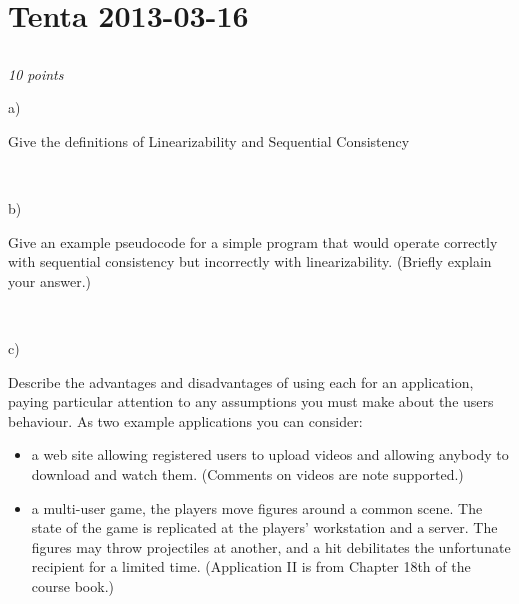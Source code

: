 \documentclass[a4paper]{article}
\newcommand{\points}[1]{\subsection{} \textit{#1 points}\\}
\newcommand{\question}[2][]{
  \noindent
  \parbox[t]{\textwidth}{#1 \parbox[t]{0.95\textwidth}{#2}}\\
}
\begin{document}
\section{Tenta 2013-03-16}
\points{10}
\label{2013-03:linearizability}
\question[a)]{
  Give the definitions of Linearizability and Sequential Consistency
}
\question[b)]{
  Give an example pseudocode for a simple program that
  would operate correctly with sequential consistency but incorrectly
  with linearizability. (Briefly explain your answer.)
}
\question[c)]{
  Describe the advantages and disadvantages of using each
  for an application, paying particular attention to any assumptions
  you must make about the users behaviour. As two example applications
  you can consider:
  \begin{itemize}
    \item a web site allowing registered users to upload videos and
      allowing anybody to download and watch them. (Comments on videos
      are note supported.)
    \item a multi-user game, the players move figures around a common
      scene. The state of the game is replicated at the players'
      workstation and a server. The figures may throw projectiles at
      another, and a hit debilitates the unfortunate recipient for a
      limited time. (Application II is from Chapter 18th of the course
      book.)
  \end{itemize}
}
\end{document}
